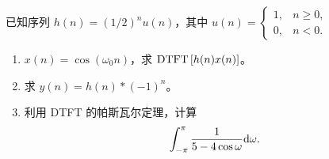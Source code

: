 \begin{exercise}
    已知序列 $h(n) = (1/2)^nu(n)$，其中 $u(n) = \begin{cases}
        1, & n \ge 0, \\
        0, & n < 0.
    \end{cases}$
    \begin{enumerate}[label=(\arabic*)]
        \item $x(n) = \cos(\omega_0 n)$，求 $\mathrm{DTFT}\left[h(n)x(n)\right]$。
        \item 求 $y(n) = h(n) * (-1)^n$。
        \item 利用 DTFT 的帕斯瓦尔定理，计算
            \begin{align*}
                \int_{-\pi}^{\pi}\frac{1}{5 - 4\cos\omega}\mathrm{d}\omega.
            \end{align*}
    \end{enumerate}
\end{exercise}

